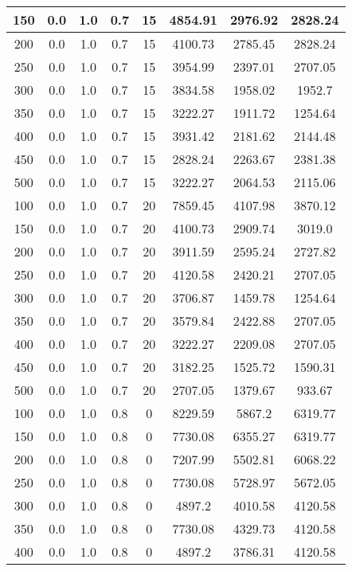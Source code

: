 \documentclass[a4paper, 12pt]{extreport}
\begin{document}
\begin{itemize}
\begin{longtable}{|c|c|c|c|c|c|c|c|}
			150 & 0.0 & 1.0 & 0.7 & 15 & 4854.91 & 2976.92 & 2828.24 \\\hline
			200 & 0.0 & 1.0 & 0.7 & 15 & 4100.73 & 2785.45 & 2828.24 \\\hline
			250 & 0.0 & 1.0 & 0.7 & 15 & 3954.99 & 2397.01 & 2707.05 \\\hline
			300 & 0.0 & 1.0 & 0.7 & 15 & 3834.58 & 1958.02 & 1952.7 \\\hline
			350 & 0.0 & 1.0 & 0.7 & 15 & 3222.27 & 1911.72 & 1254.64 \\\hline
			400 & 0.0 & 1.0 & 0.7 & 15 & 3931.42 & 2181.62 & 2144.48 \\\hline
			450 & 0.0 & 1.0 & 0.7 & 15 & 2828.24 & 2263.67 & 2381.38 \\\hline
			500 & 0.0 & 1.0 & 0.7 & 15 & 3222.27 & 2064.53 & 2115.06 \\\hline
			100 & 0.0 & 1.0 & 0.7 & 20 & 7859.45 & 4107.98 & 3870.12 \\\hline
			150 & 0.0 & 1.0 & 0.7 & 20 & 4100.73 & 2909.74 & 3019.0 \\\hline
			200 & 0.0 & 1.0 & 0.7 & 20 & 3911.59 & 2595.24 & 2727.82 \\\hline
			250 & 0.0 & 1.0 & 0.7 & 20 & 4120.58 & 2420.21 & 2707.05 \\\hline
			300 & 0.0 & 1.0 & 0.7 & 20 & 3706.87 & 1459.78 & 1254.64 \\\hline
			350 & 0.0 & 1.0 & 0.7 & 20 & 3579.84 & 2422.88 & 2707.05 \\\hline
			400 & 0.0 & 1.0 & 0.7 & 20 & 3222.27 & 2209.08 & 2707.05 \\\hline
			450 & 0.0 & 1.0 & 0.7 & 20 & 3182.25 & 1525.72 & 1590.31 \\\hline
			500 & 0.0 & 1.0 & 0.7 & 20 & 2707.05 & 1379.67 & 933.67 \\\hline
			100 & 0.0 & 1.0 & 0.8 & 0 & 8229.59 & 5867.2 & 6319.77 \\\hline
			150 & 0.0 & 1.0 & 0.8 & 0 & 7730.08 & 6355.27 & 6319.77 \\\hline
			200 & 0.0 & 1.0 & 0.8 & 0 & 7207.99 & 5502.81 & 6068.22 \\\hline
			250 & 0.0 & 1.0 & 0.8 & 0 & 7730.08 & 5728.97 & 5672.05 \\\hline
			300 & 0.0 & 1.0 & 0.8 & 0 & 4897.2 & 4010.58 & 4120.58 \\\hline
			350 & 0.0 & 1.0 & 0.8 & 0 & 7730.08 & 4329.73 & 4120.58 \\\hline
			400 & 0.0 & 1.0 & 0.8 & 0 & 4897.2 & 3786.31 & 4120.58 \\\hline

\end{longtable}
\end{itemize}
\end{document}

